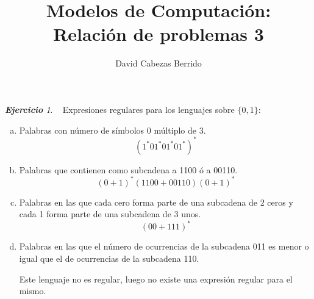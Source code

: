 \documentclass[12pt,spanish]{article}
\theoremstyle{definition}
\theoremstyle{remark}
\newtheorem{exercise}{\textbf{Ejercicio}}%
\begin{document}
\title{Modelos de Computación: \\ Relación de problemas 3}
\author{David Cabezas Berrido}
\date{\vspace{-5mm}}
\maketitle

\setcounter{exercise}{26}

\begin{exercise}~ Expresiones regulares para los lenguajes sobre $\{0,1\}$:
  \begin{enumerate}[a)]
  \item Palabras con número de símbolos 0 múltiplo de 3.
    \[(1^*01^*01^*01^*)^*\]
  \item Palabras que contienen como subcadena a 1100 ó a 00110.
    \[(0+1)^*(1100+00110)(0+1)^*\]
  \item Palabras en las que cada cero forma parte de una subcadena de 2 ceros y cada 1 forma parte de una subcadena de 3 unos.
    \[(00+111)^*\]
  \item Palabras en las que el número de ocurrencias de la subcadena 011 es menor o igual que el de ocurrencias de la subcadena 110.

    Este lenguaje no es regular, luego no existe una expresión regular
    para el mismo.
  \end{enumerate}
\end{exercise}

~

\setcounter{exercise}{28}
\end{document}
